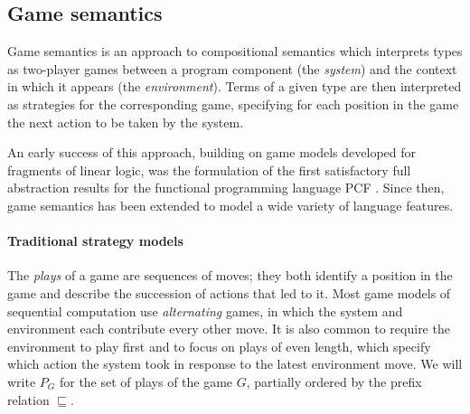 \documentclass[sigplan,screen]{acmart}
\begin{document}

\subsection{Game semantics} \label{sec:strat} %

Game semantics is an approach to compositional semantics
which interprets types as two-player games
between a program component (the \emph{system})
and the context in which it appears (the \emph{environment}).
Terms of a given type are then interpreted as
strategies for the corresponding game,
specifying for each position in the game
the next action to be taken by the system.

An early success of this approach,
building on game models developed for
fragments of linear logic,
was the formulation of the first satisfactory
full abstraction results
for the functional programming language PCF \cite{pcfajm,pcfho}.
Since then,
game semantics has been extended to
model a wide variety of language features.

\paragraph{Traditional strategy models} %

The \emph{plays} of a game are sequences of moves;
they both identify a position in the game
and describe the succession of actions that led to it.
Most game models of sequential computation
use \emph{alternating} games,
in which
the system and environment each contribute
every other move.
It is also common to require the environment to play first
and to focus on plays of even length,
which specify which action the system took
in response to the latest environment move.
We will write $P_G$ for the set of plays of the game $G$,
partially ordered by the prefix relation $\sqsubseteq$.
\end{document}
